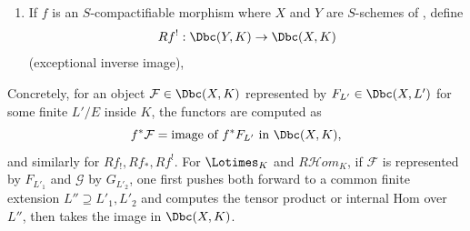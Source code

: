 \begin{definition}
\begin{enumerate}
        \item If $f$ is an $S$-compactifiable morphism where $X$ and $Y$ are $S$-schemes of , define
        $$Rf^!: \Dbc(Y,K) \to \Dbc(X,K)$$
        (exceptional inverse image),

    \end{enumerate}
    Concretely, for an object $\mathcal{F} \in \Dbc(X,K)$ represented by $F_{L'} \in \Dbc(X,L')$ for some finite $L'/E$ inside $K$, the functors are computed as
    $$f^* \mathcal{F} = \text{image of } f^* F_{L'} \text{ in } \Dbc(X,K),$$
    and similarly for $Rf_!, Rf_*, Rf^!$. For $\Lotimes_K$ and $R\mathscr{H}om_K$, if $\mathcal{F}$ is represented by $F_{L'_1}$ and $\mathcal{G}$ by $G_{L'_2}$, one first pushes both forward to a common finite extension $L'' \supseteq L'_1, L'_2$ and computes the tensor product or internal Hom over $L''$, then takes the image in $\Dbc(X,K)$.
\end{definition}
